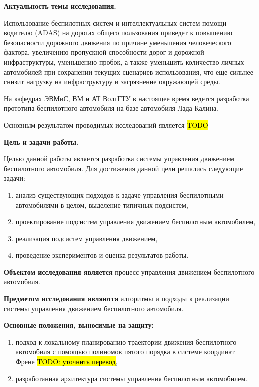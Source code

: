 \newpage


\textbf{Актуальность темы исследования.}

Использование беспилотных систем и интеллектуальных систем помощи водителю (ADAS) на дорогах общего
пользования приведет к повышению безопасности дорожного движения по причине уменьшения человеческого
фактора, увеличению пропускной способности дорог и дорожной инфраструктуры, уменьшению пробок, а также
уменьшить количество личных автомобилей при сохранении текущих сценариев использования, что еще
сильнее снизит нагрузку на инфраструктуру и загрязнение окружающей среды. 

На кафедрах ЭВМиС, ВМ и АТ ВолгГТУ в настоящее время ведется разработка прототипа беспилотного
автомобиля на базе автомобиля Лада Калина. 

Основным результатом проводимых исследований является \hl{TODO}

\textbf{Цель и задачи работы.}

Целью данной работы является разработка системы управления движением беспилотного автомобиля.
Для достижения данной цели решались следующие задачи:
\begin{enumerate}
    \item анализ существующих подходов к задаче управления беспилотными автомобилями в целом, выделение 
    типичных подсистем,
    \item проектирование подсистем управления движением беспилотным автомобилем,
    \item реализация подсистем управления движением,
    \item проведение экспериментов и оценка результатов работы. 
\end{enumerate}

\textbf{Объектом исследования является} процесс управления движением беспилотного автомобиля.

\textbf{Предметом исследования являются} алгоритмы и подходы к реализации системы управления движением
беспилотного автомобиля.

\textbf{Основные положения, выносимые на защиту:}
\begin{enumerate}
    \item подход к локальному планированию траектории движения беспилотного автомобиля с помощью
          полиномов пятого порядка в системе координат Френе \hl{TODO: уточнить перевод},
    \item разработанная архитектура системы управления беспилотным автомобилем.
\end{enumerate}

